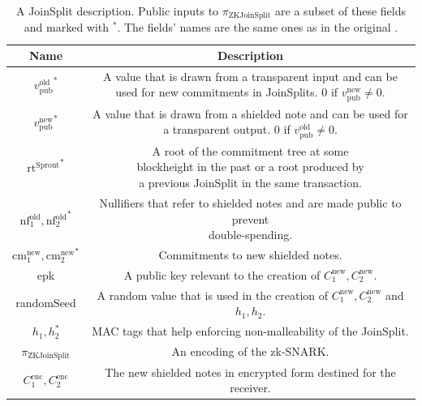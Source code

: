 \documentclass{article}
\begin{document}
\begin{center}
\begin{table}
{\tiny
\begin{tabular}{ |c|c| } 
        \hline
        \textbf{Name} & \textbf{Description} \\
        \hline
        \rule{0pt}{4ex} {\small ${v_\text{pub}^\text{old}}^\ast$} & \makecell{A value that is drawn from a transparent input and can be used\\ for new commitments in JoinSplits. $0$ if $v_\text{pub}^\text{new} \neq 0$.} \\
        \hline
        \rule{0pt}{4ex} {\small ${v_\text{pub}^\text{new}}^\ast$} & \makecell{A value that is drawn from a shielded note and can be used for\\ a transparent output. $0$ if $v_\text{pub}^\text{old} \neq 0$.} \\
        \hline
        \rule{0pt}{4ex} {\small ${\text{rt}^\text{Sprout}}^\ast$} & \makecell{A root of the commitment tree at some \\ blockheight in the past or a root produced by\\ a previous JoinSplit in the same transaction.} \\
        \hline
        \rule{0pt}{4ex} {\small $\text{nf}_1^\text{old}, {\text{nf}_2^\text{old}}^\ast$} & \makecell{Nullifiers that refer to shielded notes and are made public to prevent\\ double-spending.} \\
        \hline
        \rule{0pt}{4ex} {\small $\text{cm}_1^\text{new}, {\text{cm}_2^\text{new}}^\ast$} & Commitments to new shielded notes. \\
        \hline
        \rule{0pt}{4ex} {\small epk} & A public key relevant to the creation of $C_1^\text{new}, C_2^\text{new}$. \\
        \hline
        \rule{0pt}{4ex} {\small randomSeed} & \makecell{A random value that is used in the creation of $C_1^\text{new}, C_2^\text{new}$ and\\ $h_1, h_2$.} \\
        \hline
        \rule{0pt}{4ex} {\small $h_1, h_2^\ast$} & MAC tags that help enforcing non-malleability of the JoinSplit. \\
        \hline
        \rule{0pt}{4ex} {\small $\pi_\text{ZKJoinSplit}$} & An encoding of the zk-SNARK. \\
        \hline
        \rule{0pt}{4ex} {\small $C_1^\text{enc}, C_2^\text{enc}$} & The new shielded notes in encrypted form destined for the receiver. \\
        \hline
\end{tabular}}
\caption{A JoinSplit description. Public inputs to $\pi_\text{ZKJoinSplit}$ are a subset of these fields and marked with $^\ast$. The fields' names are the same ones as in the original \protect\cite{hopwood:zcash}.} \label{fig:joinsplit}
\end{table}
\end{center}
\end{document}
